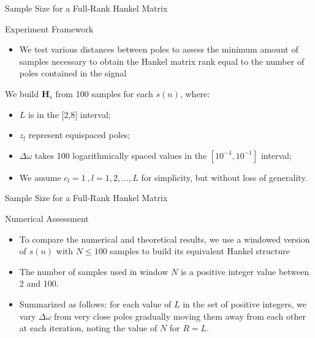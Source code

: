 \documentclass{beamer}
\begin{document}
	\begin{frame}{Sample Size for a Full-Rank Hankel Matrix}
	    
        \begin{block}{Experiment Framework}
        	\begin{itemize}
        	    \item We test various distances between poles to assess the minimum amount of samples necessary to obtain the Hankel matrix rank equal to the number of poles contained in the signal
    	    \end{itemize}
    	\end{block}

	   We build ${\mathbf{H}}_s$ from 100 samples for each $s(n)$, where:
	   
	   \begin{itemize}
	        \item $L$ is in the [2,8] interval;
	        \item $z_l$ represent equispaced poles;
	        \item $\Delta \omega$ takes 100 logarithmically spaced values in the $[10^{-4},10^{-1}]$ interval;
	        \item We assume $c_l = 1 \ , l = 1, 2, \dots, L$ for simplicity, but without loss of generality.
	   \end{itemize}

	\end{frame}
	
	\begin{frame}{Sample Size for a Full-Rank Hankel Matrix}
		
		\begin{block}{Numerical Assessment}
		    \begin{itemize}
        	    \item To compare the numerical and theoretical results, we use a windowed version of $s(n)$ with $N \leq 100$ samples to build its equivalent Hankel structure
        	    \item The number of samples used in window $N$ is a positive integer value between 2 and 100. 
        	    \item Summarized as follows: for each value of $L$ in the set of positive integers, we vary $\Delta \omega$ from very close poles gradually moving them away from each other at each iteration, noting the value of $N$ for $R = L$.
    		\end{itemize}
		\end{block}
		
	    
	\end{frame}
	
\end{document}
